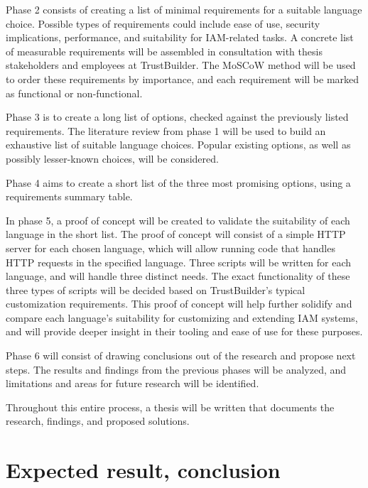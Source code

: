 Phase 2 consists of creating a list of minimal requirements for a suitable language choice. Possible types of requirements could include ease of use, security implications, performance, and suitability for IAM-related tasks. A concrete list of measurable requirements will be assembled in consultation with thesis stakeholders and employees at TrustBuilder. The MoSCoW method will be used to order these requirements by importance, and each requirement will be marked as functional or non-functional.

Phase 3 is to create a long list of options, checked against the previously listed requirements. The literature review from phase 1 will be used to build an exhaustive list of suitable language choices. Popular existing options, as well as possibly lesser-known choices, will be considered.

Phase 4 aims to create a short list of the three most promising options, using a requirements summary table.

In phase 5, a proof of concept will be created to validate the suitability of each language in the short list. The proof of concept will consist of a simple HTTP server for each chosen language, which will allow running code that handles HTTP requests in the specified language. Three scripts will be written for each language, and will handle three distinct needs. The exact functionality of these three types of scripts will be decided based on TrustBuilder's typical customization requirements. This proof of concept will help further solidify and compare each language's suitability for customizing and extending IAM systems, and will provide deeper insight in their tooling and ease of use for these purposes.

Phase 6 will consist of drawing conclusions out of the research and propose next steps. The results and findings from the previous phases will be analyzed, and limitations and areas for future research will be identified.

Throughout this entire process, a thesis will be written that documents the research, findings, and proposed solutions.


\section{Expected result, conclusion}%
\label{sec:expected_results}

